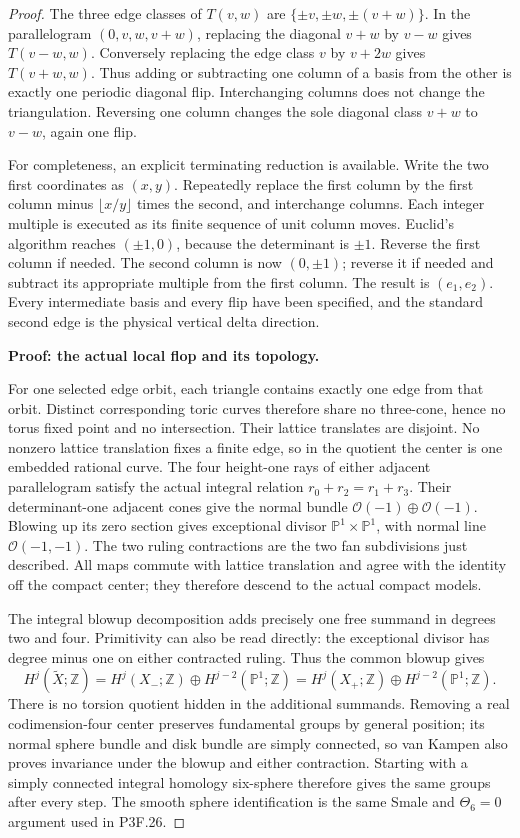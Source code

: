 \begin{proof}
The three edge classes of \(T(v,w)\) are \(\{\pm v,\pm w,\pm(v+w)\}\). In the parallelogram \((0,v,w,v+w)\), replacing the diagonal \(v+w\) by \(v-w\) gives \(T(v-w,w)\). Conversely replacing the edge class \(v\) by \(v+2w\) gives \(T(v+w,w)\). Thus adding or subtracting one column of a basis from the other is exactly one periodic diagonal flip. Interchanging columns does not change the triangulation. Reversing one column changes the sole diagonal class \(v+w\) to \(v-w\), again one flip.

For completeness, an explicit terminating reduction is available. Write the two first coordinates as \((x,y)\). Repeatedly replace the first column by the first column minus \(\lfloor x/y\rfloor\) times the second, and interchange columns. Each integer multiple is executed as its finite sequence of unit column moves. Euclid's algorithm reaches \((\pm1,0)\), because the determinant is \(\pm1\). Reverse the first column if needed. The second column is now \((0,\pm1)\); reverse it if needed and subtract its appropriate multiple from the first column. The result is \((e_1,e_2)\). Every intermediate basis and every flip have been specified, and the standard second edge is the physical vertical delta direction.

\textbf{Proof: the actual local flop and its topology.}

For one selected edge orbit, each triangle contains exactly one edge from that orbit. Distinct corresponding toric curves therefore share no three-cone, hence no torus fixed point and no intersection. Their lattice translates are disjoint. No nonzero lattice translation fixes a finite edge, so in the quotient the center is one embedded rational curve. The four height-one rays of either adjacent parallelogram satisfy the actual integral relation \(r_0+r_2=r_1+r_3\). Their determinant-one adjacent cones give the normal bundle \(\mathcal O(-1)\oplus\mathcal O(-1)\). Blowing up its zero section gives exceptional divisor \(\mathbb P^1\times\mathbb P^1\), with normal line \(\mathcal O(-1,-1)\). The two ruling contractions are the two fan subdivisions just described. All maps commute with lattice translation and agree with the identity off the compact center; they therefore descend to the actual compact models.

The integral blowup decomposition adds precisely one free summand in degrees two and four. Primitivity can also be read directly: the exceptional divisor has degree minus one on either contracted ruling. Thus the common blowup gives \[
 H^j(\widetilde X;\mathbb Z)
   =H^j(X_-;\mathbb Z)\oplus H^{j-2}(\mathbb P^1;\mathbb Z)
   =H^j(X_+;\mathbb Z)\oplus H^{j-2}(\mathbb P^1;\mathbb Z).
\] There is no torsion quotient hidden in the additional summands. Removing a real codimension-four center preserves fundamental groups by general position; its normal sphere bundle and disk bundle are simply connected, so van Kampen also proves invariance under the blowup and either contraction. Starting with a simply connected integral homology six-sphere therefore gives the same groups after every step. The smooth sphere identification is the same Smale and \(\Theta_6=0\) argument used in P3F.26.


\end{proof}
